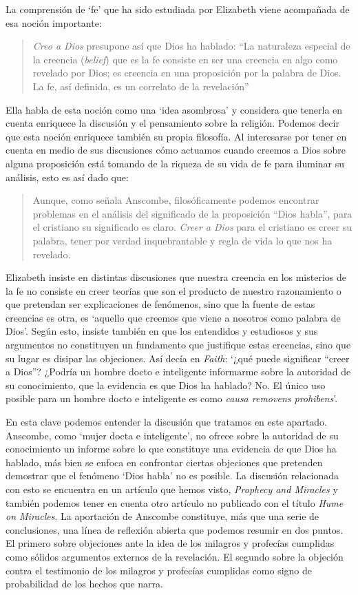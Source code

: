La comprensión de `fe' que ha sido estudiada por Elizabeth viene acompañada de esa noción importante: \blockquote[{\cite[185]{conesa1994cc}}]{\emph{Creo a Dios} presupone así que Dios ha hablado: \enquote{La naturaleza especial de la creencia (\emph{belief}) que es la fe consiste en ser una creencia en algo como revelado por Dios; es creencia en una proposición por la palabra de Dios. La fe, así definida, es un correlato de la revelación}}. Ella habla de esta noción como una `idea asombrosa' y considera que tenerla en cuenta enriquece la discusión y el pensamiento sobre la religión. Podemos decir que esta noción enriquece también su propia filosofía. Al interesarse por tener en cuenta en medio de sus discusiones cómo actuamos cuando creemos a Dios sobre alguna proposición está tomando de la riqueza de su vida de fe para iluminar su análisis, esto es así dado que: \blockquote[{\cite[185]{conesa1994cc}}]{Aunque, como señala Anscombe, filosóficamente podemos encontrar problemas en el análisis del significado de la proposición \enquote{Dios habla}, para el cristiano su significado es claro. \emph{Creer a Dios} para el cristiano es creer su palabra, tener por verdad inquebrantable y regla de vida lo que nos ha revelado.} Elizabeth insiste en distintas discusiones que nuestra creencia en los misterios de la fe no consiste en creer teorías que son el producto de nuestro razonamiento o que pretendan ser explicaciones de fenómenos, sino que la fuente de estas creencias es otra, es \enquote*{aquello que creemos que viene a nosotros como palabra de Dios}. Según esto, insiste también en que los entendidos y estudiosos y sus argumentos no constituyen un fundamento que justifique estas creencias, sino que su lugar es disipar las objeciones. Así decía en \emph{Faith}: \enquote*{¿qué puede significar ``creer a Dios''? ¿Podría un hombre docto e inteligente informarme sobre la autoridad de su conocimiento, que la evidencia es que Dios ha hablado? No. El único uso posible para un hombre docto e inteligente es como \emph{causa removens prohibens}}.

En esta clave podemos entender la discusión que tratamos en este apartado. Anscombe, como `mujer docta e inteligente', no ofrece sobre la autoridad de su conocimiento un informe sobre lo que constituye una evidencia de que Dios ha hablado, más bien se enfoca en confrontar ciertas objeciones que pretenden demostrar que el fenómeno `Dios habla' no es posible. La discusión relacionada con esto se encuentra en un artículo que hemos visto, \emph{Prophecy and Miracles} y también podemos tener en cuenta otro artículo no publicado con el título \emph{Hume on Miracles}. La aportación de Anscombe constituye, más que una serie de conclusiones, una línea de reflexión abierta que podemos resumir en dos puntos. El primero sobre objeciones ante la idea de los milagros y profecías cumplidas como sólidos argumentos externos de la revelación. El segundo sobre la objeción contra el testimonio de los milagros y profecías cumplidas como signo de probabilidad de los hechos que narra.

